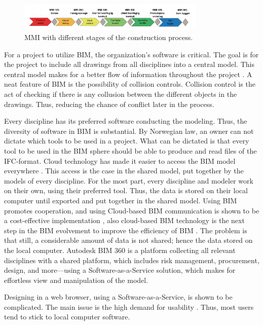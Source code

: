 \begin{figure}
    \centering
    \includegraphics[width=0.8\textwidth]{fig/mmi_process.png}
    \caption{MMI with different stages of the construction process.}
    \label{fig:mmi}
\end{figure}

For a project to utilize BIM, the organization's software is critical. The goal is for the project to include all drawings from all disciplines into a central model. This central model makes for a better flow of information throughout the project \cite{nitithamyong2006success}. A neat feature of BIM is the possibility of collision controls. Collision control is the act of checking if there is any collusion between the different objects in the drawings. Thus, reducing the chance of conflict later in the process. 

Every discipline has its preferred software conducting the modeling. Thus, the diversity of software in BIM is substantial. By Norwegian law, an owner can not dictate which tools to be used in a project. What can be dictated is that every tool to be used in the BIM sphere should be able to produce and read files of the IFC-format. Cloud technology has made it easier to access the BIM model everywhere \cite{azhar2012building}. This access is the case in the shared model, put together by the models of every discipline. For the most part, every discipline and modeler work on their own, using their preferred tool. Thus, the data is stored on their local computer until exported and put together in the shared model. Using BIM promotes cooperation, and using Cloud-based BIM communication is shown to be a cost-effective implementation \cite{das2014bimcloud}, also cloud-based BIM technology is the next step in the BIM evolvement to improve the efficiency of BIM \cite{wong2014review}. The problem is that still, a considerable amount of data is not shared; hence the data stored on the local computer. Autodesk BIM 360 is a platform collecting all relevant disciplines with a shared platform, which includes risk management, procurement, design, and more—using a Software-as-a-Service solution, which makes for effortless view and manipulation of the model. 

Designing in a web browser, using a Software-as-a-Service,  is shown to be complicated. The main issue is the high demand for usability \cite{chuang2011applying}. Thus, most users tend to stick to local computer software.

